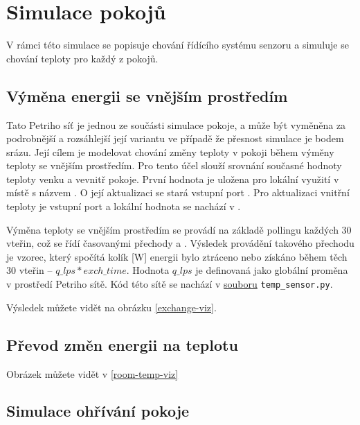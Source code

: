 \section{Simulace pokojů}
\label{sec:room-sim-details}

V rámci této simulace se popisuje chování řídícího systému senzoru a simuluje se chování teploty pro každý z pokojů.

\subsection{Výměna energii se vnějším prostředím}

Tato Petriho síť je jednou ze součásti simulace pokoje, a může být vyměněna za podrobnější a rozsáhlejší její variantu ve případě že přesnost simulace je bodem srázu. Její cílem je modelovat chování změny teploty v pokoji během výměny teploty se vnějším prostředím. Pro tento účel slouží srovnání současné hodnoty teploty venku a vevnitř pokoje. První hodnota je uložena pro lokální využití v místě s názvem . O její aktualizaci se stará vstupní port . Pro aktualizaci vnitřní teploty je vstupní port  a lokální hodnota se nachází v .

Výměna teploty se vnějším prostředím se provádí na základě pollingu každých $30$ vteřin, což se řídí časovanými přechody  a . Výsledek provádění takového přechodu je vzorec, který spočítá kolík [W] energii bylo ztráceno nebo získáno během těch $30$ vteřin -- $q\_lps*exch\_time$. Hodnota $q\_lps$ je definovaná jako globální proměna v prostředí Petriho sítě. Kód této sítě se nachází v \href{https://github.com/Danil-Grigorev/rt-sim-petry-net/blob/master/sample_nets/temp_sensor.py}{souboru} \texttt{temp\_sensor.py}.

Výsledek můžete vidět na obrázku \ref{exchange-viz}.

\subsection{Převod změn energii na teplotu}

Obrázek můžete vidět v \ref{room-temp-viz}

\subsection{Simulace ohřívání pokoje}

